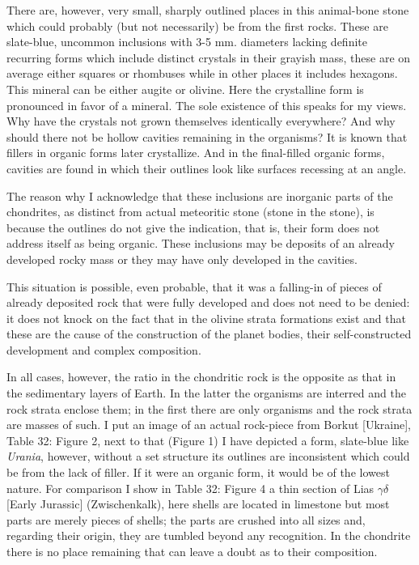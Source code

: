\documentclass[a4paper, 12pt, oneside]{article}
\begin{document}
There are, however, very small, sharply outlined places in this animal-bone stone which could probably (but not necessarily) be from the first rocks. These are slate-blue, uncommon inclusions with 3-5 mm. diameters lacking definite recurring forms which include distinct crystals in their grayish mass, these are on average either squares or rhombuses while in other places it includes hexagons. This mineral can be either augite or olivine. Here the crystalline form is pronounced in favor of a mineral. The sole existence of this speaks for my views. Why have the crystals not grown themselves identically everywhere? And why should there not be hollow cavities remaining in the organisms? It is known that fillers in organic forms later crystallize. And in the final-filled organic forms, cavities are found in which their outlines look like surfaces recessing at an angle.

The reason why I acknowledge that these inclusions are inorganic parts of the chondrites, as distinct from actual meteoritic stone (stone in the stone), is because the outlines do not give the indication, that is, their form does not address itself as being organic. These inclusions may be deposits of an already developed rocky mass or they may have only developed in the cavities.

This situation is possible, even probable, that it was a falling-in of pieces of already deposited rock that were fully developed and does not need to be denied: it does not knock on the fact that in the olivine strata formations exist and that these are the cause of the construction of the planet bodies, their self-constructed development and complex composition.

In all cases, however, the ratio in the chondritic rock is the opposite as that in the sedimentary layers of Earth. In the latter the organisms are interred and the rock strata enclose them; in the first there are only organisms and the rock strata are masses of such. I put an image of an actual rock-piece from Borkut [Ukraine], Table 32: Figure 2, next to that (Figure 1) I have depicted a form, slate-blue like \emph{Urania}, however, without a set structure its outlines are inconsistent which could be from the lack of filler. If it were an organic form, it would be of the lowest nature. For comparison I show in Table 32: Figure 4 a thin section of Lias $\gamma\delta$ [Early Jurassic] (Zwischenkalk), here shells are located in limestone but most parts are merely pieces of shells; the parts are crushed into all sizes and, regarding their origin, they are tumbled beyond any recognition. In the chondrite there is no place remaining that can leave a doubt as to their composition.
\clearpage
\end{document}
